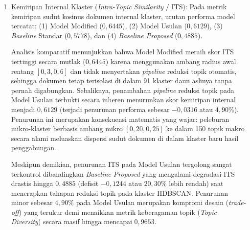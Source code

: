 \begin{enumerate}[label=\alph*., leftmargin=*, itemsep=6pt]
    Sebaliknya, tingkat \textit{outlier} yang rendah tidak serta-merta menjamin skor koherensi yang lebih tinggi. Ketika suatu model mengevaluasi volume korpus yang sangat besar, seperti pada Model Usulan yang mempertahankan $48.060$ dokumen ($93{,}17\%$ retensi) atau Model Modified dengan $49.195$ dokumen ($95{,}37\%$ retensi), model dihadapkan pada variasi leksikal yang jauh lebih kompleks, percakapan informal, serta konteks obrolan yang beragam. Meskipun mengevaluasi data dalam jumlah yang jauh lebih masif, Model Usulan ($+0{,}0495$) mampu mengungguli Model Modified ($+0{,}0260$) dengan kenaikan koherensi sebesar $+0{,}0235$ (peningkatan relatif $+90{,}38\%$), sekaligus membalikkan defisit skor negatif pada \textit{Baseline} Standar ($-0{,}0210$) dengan margin $+0{,}0705$. Dampaknya, kata kunci yang dihasilkan Model Usulan terbukti memiliki asosiasi semantik yang tetap padu dan representatif meskipun mencakup spektrum percakapan komunitas berskala penuh.

    \item Kemiripan Internal Klaster (\textit{Intra-Topic Similarity} / ITS):
    Pada metrik kemiripan sudut kosinus dokumen internal klaster, urutan performa model tercatat: (1) Model Modified ($0{,}6445$), (2) Model Usulan ($0{,}6129$), (3) \textit{Baseline} Standar ($0{,}5778$), dan (4) \textit{Baseline Proposed} ($0{,}4885$).
    
    Analisis komparatif menunjukkan bahwa Model Modified meraih skor ITS tertinggi secara mutlak ($0{,}6445$) karena menggunakan ambang radius awal rentang $[0{,}3, 0{,}6]$ dan tidak menyertakan \textit{pipeline} reduksi topik otomatis, sehingga dokumen tetap terisolasi di dalam 91 klaster daun aslinya tanpa pernah digabungkan. Sebaliknya, penambahan \textit{pipeline} reduksi topik pada Model Usulan terbukti secara inheren menurunkan skor kemiripan internal menjadi $0{,}6129$ (terjadi penurunan performa sebesar $-0{,}0316$ atau $4{,}90\%$). Penurunan ini merupakan konsekuensi matematis yang wajar: peleburan mikro-klaster berbasis ambang mikro $[0{,}20, 0{,}25]$ ke dalam 150 topik makro secara alami meluaskan dispersi sudut dokumen di dalam klaster baru hasil penggabungan.
    
    Meskipun demikian, penurunan ITS pada Model Usulan tergolong sangat terkontrol dibandingkan \textit{Baseline Proposed} yang mengalami degradasi ITS drastis hingga $0{,}4885$ (defisit $-0{,}1244$ atau $20{,}30\%$ lebih rendah) saat menerapkan tahapan reduksi topik pada klaster HDBSCAN. Penurunan minor sebesar $4{,}90\%$ pada Model Usulan merupakan kompromi desain (\textit{trade-off}) yang terukur demi menaikkan metrik keberagaman topik (\textit{Topic Diversity}) secara masif hingga mencapai $0{,}9653$.


\end{enumerate}
